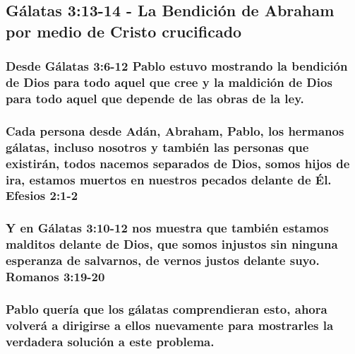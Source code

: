 \documentclass[11a pt,twoside]{article}
\let\oldsubsection\subsection
\renewcommand{\subsection}{\needspace{5\baselineskip}\oldsubsection}
\let\oldsubsubsection\subsubsection
\renewcommand{\subsubsection}{\needspace{4\baselineskip}\oldsubsubsection}
\begin{document}
\subsection{Gálatas 3:13-14 - La Bendición de Abraham por medio de
Cristo
crucificado}\label{guxe1latas-313-14---la-bendiciuxf3n-de-abraham-por-medio-de-cristo-crucificado}

\subsubsection{Desde Gálatas 3:6-12 Pablo estuvo mostrando la bendición
de Dios para todo aquel que cree y la maldición de Dios para todo aquel
que depende de las obras de la
ley.}\label{desde-guxe1latas-36-12-pablo-estuvo-mostrando-la-bendiciuxf3n-de-dios-para-todo-aquel-que-cree-y-la-maldiciuxf3n-de-dios-para-todo-aquel-que-depende-de-las-obras-de-la-ley.}

\subsubsection{Cada persona desde Adán, Abraham, Pablo, los hermanos
gálatas, incluso nosotros y también las personas que existirán, todos
nacemos separados de Dios, somos hijos de ira, estamos muertos en
nuestros pecados delante de Él. Efesios
2:1-2}\label{cada-persona-desde-aduxe1n-abraham-pablo-los-hermanos-guxe1latas-incluso-nosotros-y-tambiuxe9n-las-personas-que-existiruxe1n-todos-nacemos-separados-de-dios-somos-hijos-de-ira-estamos-muertos-en-nuestros-pecados-delante-de-uxe9l.-efesios-21-2}

\subsubsection{Y en Gálatas 3:10-12 nos muestra que también estamos
malditos delante de Dios, que somos injustos sin ninguna esperanza de
salvarnos, de vernos justos delante suyo. Romanos
3:19-20}\label{y-en-guxe1latas-310-12-nos-muestra-que-tambiuxe9n-estamos-malditos-delante-de-dios-que-somos-injustos-sin-ninguna-esperanza-de-salvarnos-de-vernos-justos-delante-suyo.-romanos-319-20}

\subsubsection{Pablo quería que los gálatas comprendieran esto, ahora
volverá a dirigirse a ellos nuevamente para mostrarles la verdadera
solución a este
problema.}\label{pablo-queruxeda-que-los-guxe1latas-comprendieran-esto-ahora-volveruxe1-a-dirigirse-a-ellos-nuevamente-para-mostrarles-la-verdadera-soluciuxf3n-a-este-problema.}
\end{document}
